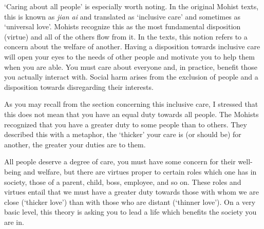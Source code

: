 `Caring about all people' is especially worth noting. In the original Mohist texts, this is known as \emph{jian ai} and translated as `inclusive care' and sometimes as `universal love'. Mohists recognize this as the most fundamental disposition (virtue) and all of the others flow from it. In the texts, this notion refers to a concern about the welfare of another. Having a disposition towards inclusive care will open your eyes to the needs of other people and motivate you to help them when you are able.  You must care about everyone and, in practice, benefit those you actually interact with. Social harm arises from the exclusion of people and a disposition towards disregarding their interests.

As you may recall from the section concerning this inclusive care, I stressed that this does not mean that you have an equal duty towards all people. The Mohists recognized that you have a greater duty to some people than to others. They described this with a metaphor, the `thicker' your care is (or should be) for another, the greater your duties are to them. 


All people deserve a degree of care, you must have some concern for their well-being and welfare, but there are virtues proper to certain roles which one has in society, those of a parent, child, boss, employee, and so on. These roles and virtues entail that we must have a greater duty towards those with whom we are close (`thicker love') than with those who are distant (`thinner love').  On a very basic level, this theory is asking you to lead a life which benefits the society you are in.
